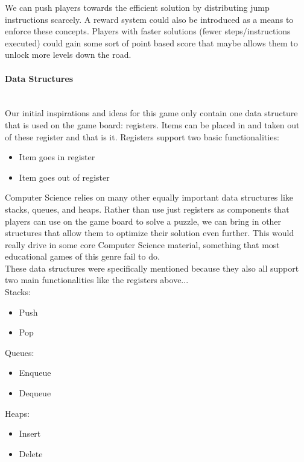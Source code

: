 We can push players towards the efficient solution by distributing jump instructions scarcely.
A reward system could also be introduced as a means to enforce these concepts. Players with
faster solutions (fewer steps/instructions executed) could gain some sort of point based
score that maybe allows them to unlock more levels down the road.\\

\paragraph{Data Structures}\mbox{} \\
Our initial inspirations and ideas for this game only contain one data structure that is
used on the game board: registers. Items can be placed in and taken out of these register and that
is it. Registers support two basic functionalities:
\begin{itemize}
  \item Item goes in register
  \item Item goes out of register
\end{itemize}

Computer Science relies on many other equally important data structures like stacks,
queues, and heaps. Rather than use just registers as components that players can use on
the game board to solve a puzzle, we can bring in other structures that allow them to
optimize their solution even further. This would really drive in some core Computer Science
material, something that most educational games of this genre fail to do.\\

These data structures were specifically mentioned because they also
all support two main functionalities like the registers above...\\

Stacks:
\begin{itemize}
  \item Push
  \item Pop
\end{itemize}

Queues:
\begin{itemize}
  \item Enqueue
  \item Dequeue
\end{itemize}

Heaps:
\begin{itemize}
  \item Insert
  \item Delete
\end{itemize}

